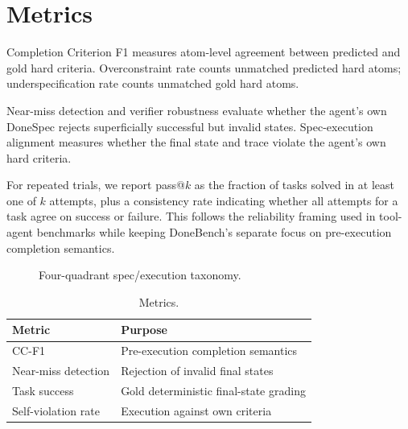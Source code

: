 \section{Metrics}
Completion Criterion F1 measures atom-level agreement between predicted and gold hard criteria. Overconstraint rate counts unmatched predicted hard atoms; underspecification rate counts unmatched gold hard atoms.

Near-miss detection and verifier robustness evaluate whether the agent's own DoneSpec rejects superficially successful but invalid states. Spec-execution alignment measures whether the final state and trace violate the agent's own hard criteria.

For repeated trials, we report pass@\(k\) as the fraction of tasks solved in at least one of \(k\) attempts, plus a consistency rate indicating whether all attempts for a task agree on success or failure. This follows the reliability framing used in tool-agent benchmarks while keeping DoneBench's separate focus on pre-execution completion semantics.

\begin{figure}[tbp]
\centering
{}
\caption{Four-quadrant spec/execution taxonomy.}
\end{figure}

\begin{table}[tbp]
\centering
\begin{tabular}{ll}
\toprule
Metric & Purpose \\
\midrule
CC-F1 & Pre-execution completion semantics \\
Near-miss detection & Rejection of invalid final states \\
Task success & Gold deterministic final-state grading \\
Self-violation rate & Execution against own criteria \\
\bottomrule
\end{tabular}
\caption{Metrics.}
\end{table}
